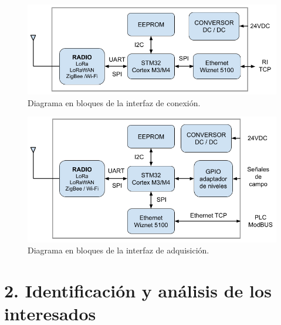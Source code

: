 \documentclass[
11pt%
]{charter}
\begin{document}
\vspace{5px}

\begin{figure}[htpb]
\centering 
\includegraphics[width=.75\textwidth]{./Figuras/Interfaz_conn.png}
\caption{Diagrama en bloques de la interfaz de conexión.}
\label{fig:diagBloques}
\end{figure}

\vspace{5px}

\begin{figure}[htpb]
\centering 
\includegraphics[width=.75\textwidth]{./Figuras/Interfaz_captura.png}
\caption{Diagrama en bloques de la interfaz de adquisición.}
\label{fig:diagBloques}
\end{figure}

\vspace{25px}







\section{2. Identificación y análisis de los interesados}
\label{sec:interesados}
\end{document}
